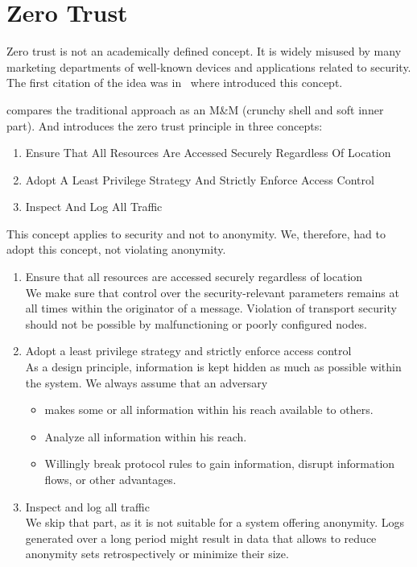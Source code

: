 \section{Zero Trust}\label{sec:zeroTrust}
Zero trust is not an academically defined concept. It is widely misused by many marketing departments of well-known devices and applications related to security. The first citation of the idea was in~\cite{kindervag2010no} where \citeauthor{kindervag2010no} introduced this concept.

\citeauthor{kindervag2010no} compares the traditional approach as an M\&M (crunchy shell and soft inner part). And introduces the zero trust principle in three concepts:
\begin{shadequote}{}
	\begin{enumerate}
		\item Ensure That All Resources Are Accessed Securely Regardless Of Location
		\item Adopt A Least Privilege Strategy And Strictly Enforce Access Control
		\item Inspect And Log All Traffic
	\end{enumerate}
\end{shadequote}

This concept applies to security and not to anonymity. We, therefore, had to adopt this concept, not violating anonymity.
\begin{enumerate}
	\item Ensure that all resources are accessed securely regardless of location\\
	We make sure that control over the security-relevant parameters remains at all times within the originator of a message. Violation of transport security should not be possible by malfunctioning or poorly configured nodes.
	\item Adopt a least privilege strategy and strictly enforce access control\\
	As a design principle, information is kept hidden as much as possible within the system. We always assume that an adversary
	\begin{itemize}
		\item makes some or all information within his reach available to others.
		\item Analyze all information within his reach.
		\item Willingly break protocol rules to gain information, disrupt information flows, or other advantages.
	\end{itemize}		
	\item Inspect and log all traffic\\
	We skip that part, as it is not suitable for a system offering anonymity. Logs generated over a long period might result in data that allows to reduce anonymity sets retrospectively or minimize their size.
	
\end{enumerate}

